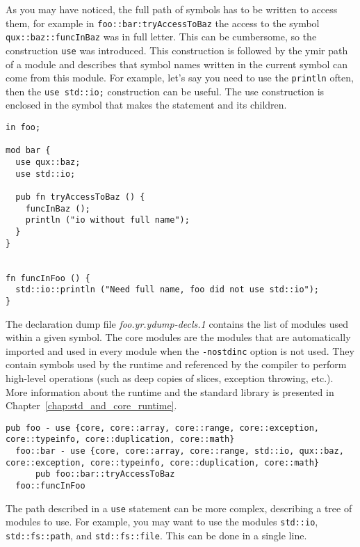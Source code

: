 As you may have noticed, the full path of symbols has to be written to access
them, for example in \texttt{foo::bar:tryAccessToBaz} the access to the symbol
\texttt {qux::baz::funcInBaz} was in full letter. This can be cumbersome, so the
construction \texttt{use} was introduced. This construction is followed by the
ymir path of a module and describes that symbol names written in the current
symbol can come from this module. For example, let's say you need to use the
\texttt{println} often, then the \texttt{use std::io;} construction can be
useful. The use construction is enclosed in the symbol that makes the statement
and its children.

\begin{minipage}{\linewidth}
\begin{lstlisting}[caption=\textit{./foo.yr}, style=coloredverbatim]
in foo;

mod bar {
  use qux::baz;
  use std::io;

  pub fn tryAccessToBaz () {
    funcInBaz ();
    println ("io without full name");
  }
}


fn funcInFoo () {
  std::io::println ("Need full name, foo did not use std::io");
}
\end{lstlisting}
\end{minipage}
The declaration dump file \textit{foo.yr.ydump-decls.1} contains the list of
modules used within a given symbol. The core modules are the modules that are
automatically imported and used in every module when the \texttt{-nostdinc}
option is not used. They contain symbols used by the runtime and referenced by
the compiler to perform high-level operations (such as deep copies of slices,
exception throwing, etc.). More information about the runtime and the standard
library is presented in Chapter~\ref{chap:std_and_core_runtime}.

\begin{minipage}{\linewidth}
\begin{lstlisting}[caption=\textit{foo.yr.ydump-decls.1}, style=intermediateVerb]
pub foo - use {core, core::array, core::range, core::exception, core::typeinfo, core::duplication, core::math}
  foo::bar - use {core, core::array, core::range, std::io, qux::baz, core::exception, core::typeinfo, core::duplication, core::math}
      pub foo::bar::tryAccessToBaz
  foo::funcInFoo
\end{lstlisting}
\end{minipage}

The path described in a \texttt{use} statement can be more complex, describing a
tree of modules to use. For example, you may want to use the modules
\texttt{std::io}, \texttt{std::fs::path}, and \texttt{std::fs::file}. This can
be done in a single line.

